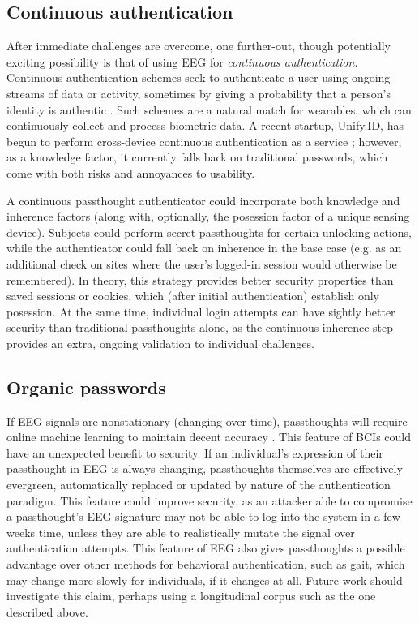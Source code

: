 \documentclass[sigconf]{acmart}
\begin{document}
\subsection{Continuous authentication}
\label{sec:org2fb9b4d}

After immediate challenges are overcome,
one further-out, though potentially exciting possibility is that of using EEG for \emph{continuous authentication}.
Continuous authentication schemes seek to authenticate a user using ongoing streams of data or activity, sometimes by giving a probability that a person's identity is authentic \cite{Bojinov2012}.
Such schemes are a natural match for wearables, which can continuously collect and process biometric data.
A recent startup, Unify.ID, has begun to perform cross-device continuous authentication as a service \cite{UnifyID2017};
however, as a knowledge factor, it currently falls back on traditional passwords, which come with both risks and annoyances to usability.

A continuous passthought authenticator could incorporate both knowledge and inherence factors (along with, optionally, the posession factor of a unique sensing device).
Subjects could perform secret passthoughts for certain unlocking actions,
while the authenticator could fall back on inherence in the base case (e.g. as an additional check on sites where the user's logged-in session would otherwise be remembered).
In theory, this strategy provides better security properties than saved sessions or cookies, which (after initial authentication) establish only posession. At the same time, individual login attempts can have sightly better security than traditional passthoughts alone, as the continuous inherence step provides an extra, ongoing validation to individual challenges.

\subsection{Organic passwords}
\label{sec:orgc62bd8d}

If EEG signals are nonstationary (changing over time), passthoughts will require online machine learning to maintain decent accuracy \cite{Vidaurre2006a}.
This feature of BCIs could have an unexpected benefit to security. 
If an individual's expression of their passthought in EEG is always changing, 
passthoughts themselves are effectively evergreen, automatically replaced or updated by nature of the authentication paradigm.
This feature could improve security, as an attacker able to compromise a passthought's EEG signature may not be able to log into the system in a few weeks time,
unless they are able to realistically mutate the signal over authentication attempts.
This feature of EEG also gives passthoughts a possible advantage over other methods for behavioral authentication, such as gait, which may change more slowly for individuals, if it changes at all.
Future work should investigate this claim, perhaps using a longitudinal corpus such as the one described above.
\end{document}
